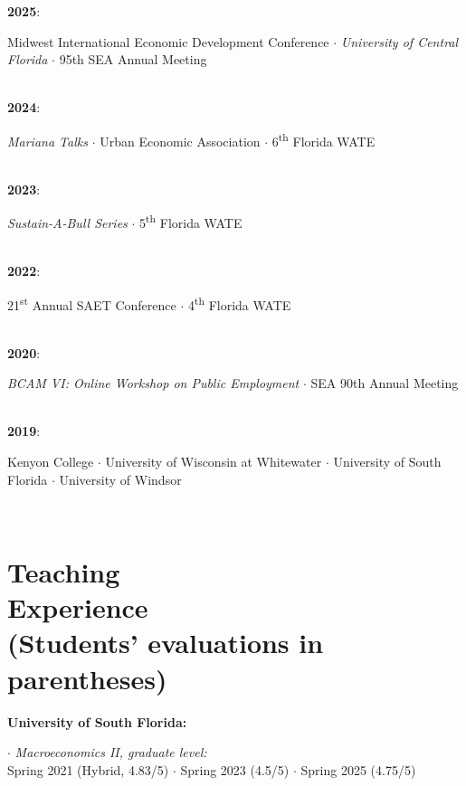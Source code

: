 \documentclass[mm, 10pt]{simple_style}
\begin{document}
\begin{resume}
\textbf{2025}: \begin{minipage}[t]{0.9\textwidth}
        {Midwest International Economic Development Conference} 
        $\cdot$ {\color{gray} \textit{University of Central Florida}}
        $\cdot$ {\color{gray} 95th SEA Annual Meeting}
        \end{minipage}\\
\textbf{2024}: \begin{minipage}[t]{0.9\textwidth}
        \emph{Mariana Talks}
        $\cdot$ {Urban Economic Association} 
        $\cdot$ {6\textsuperscript{th} Florida WATE}
        \end{minipage}\\
\textbf{2023}: \begin{minipage}[t]{0.9\textwidth}
        \emph{Sustain-A-Bull Series}
        $\cdot$ 5\textsuperscript{th} Florida WATE
        \end{minipage}\\
\textbf{2022}: \begin{minipage}[t]{0.9\textwidth}
        21\textsuperscript{st} Annual SAET Conference 
        $\cdot$ 4\textsuperscript{th} Florida WATE 
        \end{minipage}\\
\textbf{2020}: \begin{minipage}[t]{0.9\textwidth}
        \emph{BCAM VI: Online Workshop on Public Employment} $\cdot$ SEA 90th Annual Meeting
        \end{minipage}\\        
\textbf{2019}: \begin{minipage}[t]{0.9\textwidth}
        Kenyon College 
        $\cdot$ University of Wisconsin at Whitewater 
        $\cdot$ University of South Florida 
        $\cdot$ University of Windsor 
        \end{minipage}\\         


\clearpage
\section{Teaching\\ Experience \\ {\protect\footnotesize (Students' evaluations in parentheses)}}

\textbf{University of South Florida:}

$\cdot$ \textit{Macroeconomics II, graduate level:} \\
\indent \hspace{1cm} Spring 2021 (Hybrid, 4.83/5) $\cdot$ Spring 2023 (4.5/5) $\cdot$ Spring 2025 (4.75/5)


\end{resume}
\end{document}
